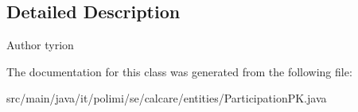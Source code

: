 \subsection{Detailed Description}
\begin{DoxyAuthor}{Author}
tyrion 
\end{DoxyAuthor}


The documentation for this class was generated from the following file\+:\begin{DoxyCompactItemize}
\item 
src/main/java/it/polimi/se/calcare/entities/Participation\+P\+K.\+java\end{DoxyCompactItemize}
